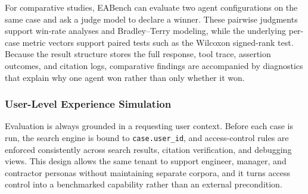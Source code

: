 For comparative studies, EABench can evaluate two agent configurations on the same case and ask a judge model to declare a winner. These pairwise judgments support win-rate analyses and Bradley--Terry modeling, while the underlying per-case metric vectors support paired tests such as the Wilcoxon signed-rank test. Because the result structure stores the full response, tool trace, assertion outcomes, and citation logs, comparative findings are accompanied by diagnostics that explain why one agent won rather than only whether it won.

\subsubsection{User-Level Experience Simulation}

Evaluation is always grounded in a requesting user context. Before each case is run, the search engine is bound to \texttt{case.user\_id}, and access-control rules are enforced consistently across search results, citation verification, and debugging views. This design allows the same tenant to support engineer, manager, and contractor personas without maintaining separate corpora, and it turns access control into a benchmarked capability rather than an external precondition.